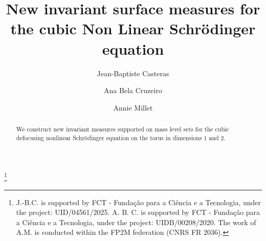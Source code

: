 \documentclass[11pt,leqno]{amsart}
\begin{document}
\title[
Invariant measure NLS]{New invariant surface measures for the cubic Non Linear Schr\"odinger equation}
\author[J.-B. Casteras]{Jean-Baptiste Casteras}
\address{CEMSUL, Faculdade de Ci\^encias da Universidade de Lisboa, Edificio C6, Piso 1, Campo Grande 1749-016 Lisboa, Portugal}
\author[A. B. Cruzeiro]{Ana Bela Cruzeiro}
\address{GFM, Dep. de Matem\' atica, Instituto Superior T\' ecnico, Lisboa, Portugal}
\author[A. Millet]{Annie Millet}
\address{SAMM, EA 4543, Universit\' e Paris 1 Panth\' eon Sorbonne, 90 Rue de Tolbiac, 75634 Paris
Cedex France and Laboratoire de Probabilit\' es, Statistique et Mod\' elisation, UMR 8001,
Sorbonne Universit\' e - Universit\'e Paris Cit\'e.}
\thanks{J.-B.C. is supported by FCT - Funda\c c\~ao para a Ci\^encia e a Tecnologia, under the project: UID/04561/2025. A. B. C.  is supported by FCT - Funda\c c\~ao para a Ci\^encia e a Tecnologia, under the project: UIDB/00208/2020. The work of A.M. is conducted within the FP2M federation (CNRS FR 2036).}

\begin{abstract}
We construct new invariant measures supported on mass level sets for the cubic defocusing nonlinear Schr\" odinger equation
 on the torus in dimensions $1$ and $2$. 
\end{abstract}


\maketitle
\end{document}
